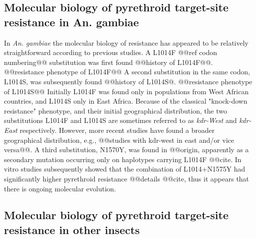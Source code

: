 \documentclass[a4paper,11pt,abstracton,hidelinks]{scrartcl}
\begin{document}
\subsection*{Molecular biology of pyrethroid target-site resistance in An. gambiae}


%
In \textit{An. gambiae} the molecular biology of resistance has appeared to be relatively straightforward according to previous studies.
%
A L1014F @@ref codon numbering@@ substitution was first found @@history of L1014F@@.
%
@@resistance phenotype of L1014F@@
%
A second substitution in the same codon, L1014S, was subsequently found @@history of L1014S@.
%
@@resistance phenotype of L1014S@@
%
Initially L1014F was found only in populations from West African countries, and L1014S only in East Africa.
%
Because of the classical "knock-down resistance" phenotype, and their initial geographical distribution, the two substitutions L1014F and L1014S are sometimes referred to as \textit{kdr-West} and \textit{kdr-East} respectively.
%
However, more recent studies have found a broader geographical distribution, e.g., @@studies with kdr-west in east and/or vice versa@@.
%
A third substitution, N1570Y, was found in @@origin, apparently as a secondary mutation occurring only on haplotypes carrying L1014F @@cite.
%
In vitro studies subsequently showed that the combination of L1014+N1575Y had significantly higher pyrethroid resistance @@details @@cite, thus it appears that there is ongoing molecular evolution.


\subsection*{Molecular biology of pyrethroid target-site resistance in other insects}
\end{document}
